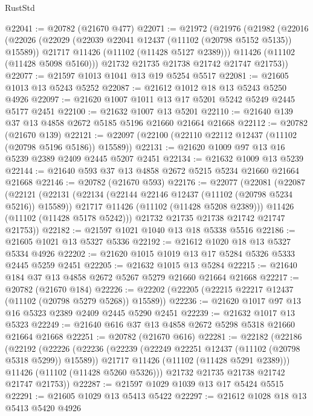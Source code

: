 \begin{lexlean}{RustStd}
\begin{coremodule}
@22041 := @20782 (@21670 @477)
@22071 := @21972
    (@21976
      (@21982
        (@22016
          (@22026
            (@22029 (@22039 @22041 @12437 (@11102 (@20798 @5152 @5135)) @15589))
            @21717
            @11426
            (@11102 (@11428 @5127 @2389)))
          @11426
          (@11102 (@11428 @5098 @5160)))
        @21732
        @21735
        @21738
        @21742
        @21747
        @21753))
@22077 := @21597 @1013 @1041 @13 @19 @5254 @5517
@22081 := @21605 @1013 @13 @5243 @5252
@22087 := @21612 @1012 @18 @13 @5243 @5250 @4926
@22097 := @21620 @1007 @1011 @13 @17 @5201 @5242 @5249 @2445 @5177 @2451
@22100 := @21632 @1007 @13 @5201
@22110 := @21640 @139 @37 @13 @4858 @2672 @5185 @5196 @21660 @21664 @21668
@22112 := @20782 (@21670 @139)
@22121 := @22097 (@22100 (@22110 @22112 @12437 (@11102 (@20798 @5196 @5186)) @15589))
@22131 := @21620 @1009 @97 @13 @16 @5239 @2389 @2409 @2445 @5207 @2451
@22134 := @21632 @1009 @13 @5239
@22144 := @21640 @593 @37 @13 @4858 @2672 @5215 @5234 @21660 @21664 @21668
@22146 := @20782 (@21670 @593)
@22176 := @22077
    (@22081
      (@22087
        (@22121
          (@22131
            (@22134 (@22144 @22146 @12437 (@11102 (@20798 @5234 @5216)) @15589))
            @21717
            @11426
            (@11102 (@11428 @5208 @2389)))
          @11426
          (@11102 (@11428 @5178 @5242)))
        @21732
        @21735
        @21738
        @21742
        @21747
        @21753))
@22182 := @21597 @1021 @1040 @13 @18 @5338 @5516
@22186 := @21605 @1021 @13 @5327 @5336
@22192 := @21612 @1020 @18 @13 @5327 @5334 @4926
@22202 := @21620 @1015 @1019 @13 @17 @5284 @5326 @5333 @2445 @5259 @2451
@22205 := @21632 @1015 @13 @5284
@22215 := @21640 @184 @37 @13 @4858 @2672 @5267 @5279 @21660 @21664 @21668
@22217 := @20782 (@21670 @184)
@22226 := @22202 (@22205 (@22215 @22217 @12437 (@11102 (@20798 @5279 @5268)) @15589))
@22236 := @21620 @1017 @97 @13 @16 @5323 @2389 @2409 @2445 @5290 @2451
@22239 := @21632 @1017 @13 @5323
@22249 := @21640 @616 @37 @13 @4858 @2672 @5298 @5318 @21660 @21664 @21668
@22251 := @20782 (@21670 @616)
@22281 := @22182
    (@22186
      (@22192
        (@22226
          (@22236
            (@22239 (@22249 @22251 @12437 (@11102 (@20798 @5318 @5299)) @15589))
            @21717
            @11426
            (@11102 (@11428 @5291 @2389)))
          @11426
          (@11102 (@11428 @5260 @5326)))
        @21732
        @21735
        @21738
        @21742
        @21747
        @21753))
@22287 := @21597 @1029 @1039 @13 @17 @5424 @5515
@22291 := @21605 @1029 @13 @5413 @5422
@22297 := @21612 @1028 @18 @13 @5413 @5420 @4926

\end{coremodule}
\end{lexlean}

